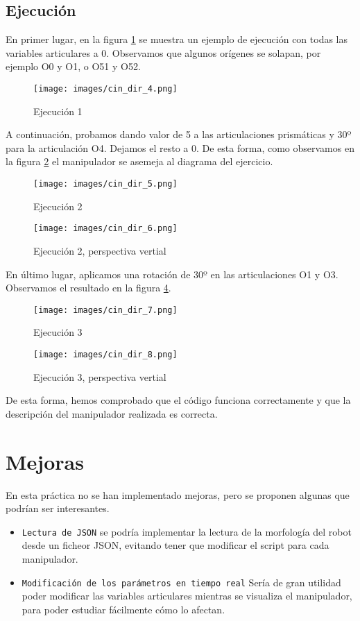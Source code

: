 \subsection{Ejecución}
En primer lugar, en la figura \ref{chapter:ejecucion1} se muestra un ejemplo de ejecución con todas las variables articulares a 0. Observamos que algunos orígenes se solapan, por ejemplo O0 y O1, o O51 y O52.
\begin{figure}[htb]
   \centering
   \texttt{[image: images/cin\_dir\_4.png]}
   \caption{Ejecución 1}
   \label{chapter:ejecucion1}
\end{figure}

A continuación, probamos dando valor de 5 a las articulaciones prismáticas y 30º para la articulación O4. Dejamos el resto a 0. De esta forma, como observamos en la figura \ref{chapter:ejecucion2a} el manipulador se asemeja al diagrama del ejercicio.
\begin{figure}[htb]
   \centering
   \texttt{[image: images/cin\_dir\_5.png]}
   \caption{Ejecución 2}
   \label{chapter:ejecucion2a}
\end{figure}
\begin{figure}[htb]
   \centering
   \texttt{[image: images/cin\_dir\_6.png]}
   \caption{Ejecución 2, perspectiva vertial}
   \label{chapter:ejecucion2b}
\end{figure}

En último lugar, aplicamos una rotación de 30º en las articulaciones O1 y O3. Observamos el resultado en la figura \ref{chapter:ejecucion3a}.
\begin{figure}[htb]
   \centering
   \texttt{[image: images/cin\_dir\_7.png]}
   \caption{Ejecución 3}
   \label{chapter:ejecucion3a}
\end{figure}
\begin{figure}[htb]
   \centering
   \texttt{[image: images/cin\_dir\_8.png]}
   \caption{Ejecución 3, perspectiva vertial}
   \label{chapter:ejecucion3b}
\end{figure}

De esta forma, hemos comprobado que el código funciona correctamente y que la descripción del manipulador realizada es correcta.

\section{Mejoras}
En esta práctica no se han implementado mejoras, pero se proponen algunas que podrían ser interesantes.
\begin{itemize}
   \item \texttt{Lectura de JSON} se podría implementar la lectura de la morfología del robot desde un ficheor JSON, evitando tener que modificar el script para cada manipulador.
   \item \texttt{Modificación de los parámetros en tiempo real} Sería de gran utilidad poder modificar las variables articulares mientras se visualiza el manipulador, para poder estudiar fácilmente cómo lo afectan.
\end{itemize}

